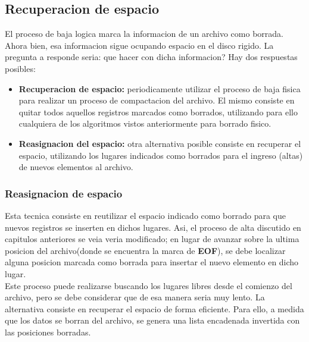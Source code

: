 \subsection{Recuperacion de espacio}
El proceso de baja logica marca la informacion de un archivo como borrada. Ahora bien, esa informacion sigue ocupando espacio en el disco rigido. La pregunta a responde seria: que hacer  con dicha informacion? Hay dos respuestas posibles:
\begin{itemize}
  \item \textbf{Recuperacion de espacio: }periodicamente utilizar el proceso de baja fisica para realizar un proceso de compactacion del archivo. El mismo consiste en quitar todos aquellos registros marcados como borrados, utilizando para ello cualquiera de los algoritmos vistos anteriormente para borrado fisico.
  \item \textbf{Reasignacion del espacio: }otra alternativa posible consiste en recuperar el espacio, utilizando los lugares indicados como borrados para el ingreso (altas) de nuevos elementos al archivo.
\end{itemize}

\subsubsection{Reasignacion de espacio}Esta tecnica consiste en reutilizar el espacio indicado como borrado para que nuevos registros se inserten en dichos lugares. Asi, el proceso de alta discutido en capitulos anteriores se veia veria modificado; en lugar de avanzar sobre la ultima posicion del archivo(donde se encuentra la marca de \textbf{EOF}), se debe localizar alguna posicion marcada como borrada para insertar el nuevo elemento en dicho lugar.\\
Este proceso puede realizarse buscando los lugares libres desde el comienzo del archivo, pero se debe considerar que de esa manera seria muy lento. La alternativa consiste en recuperar el espacio de forma eficiente. Para ello, a medida que los datos se borran del archivo, se genera una lista encadenada invertida con las posiciones borradas.

